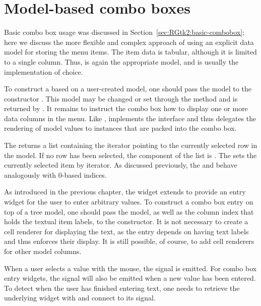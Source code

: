
\section{Model-based combo boxes}
\label{sec:RGtk2:mvc:combobox}

Basic combo box usage was discussed in
Section~\ref{sec:RGtk2:basic-combobox}; here we discuss the more
flexible and complex approach of using an explicit data model for
storing the menu items. The item data is tabular, although it is
limited to a single column. Thus,  is again the
appropriate model, and  is usually the
implementation of choice.

To construct a  based on a user-created model, one
should pass the model to the constructor
. This model may be changed or set through
the  method and is returned by
. It remains to instruct the combo box
how to display one or more data columns in the menu. Like
,  implements the
 interface and thus delegates the rendering of
model values to  instances that are packed into
the combo box.

The  returns a list containing the iterator
pointing to the currently selected row in the model.  If no row has been
selected, the  component of the list is .
The  sets the currently selected
item by iterator. As discussed previously, the
 and 
behave analogously with $0$-based indices.

As introduced in the previous chapter, the 
widget extends  to provide an entry widget for the
user to enter arbitrary values. To construct a combo box entry on top
of a tree model, one should pass the model, as well as the column
index that holds the textual item labels, to the
 constructor. It is not necessary to
create a cell renderer for displaying the text, as the entry depends
on having text labels and thus enforces their display. It is still
possible, of course, to add cell renderers for other model columns.

When a user selects a value with the mouse, the  signal
is emitted. For combo box entry widgets, the  signal
will also be emitted when a new value has been entered. To detect when
the user has finished entering text, one needs to retrieve the
underlying  widget with  and
connect to its  signal.

